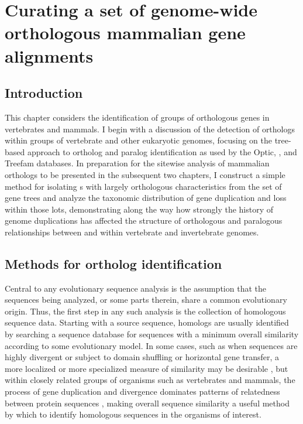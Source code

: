 \chapter{Curating a set of genome-wide orthologous mammalian gene alignments}
\label{ch_orthologs}

\section{Introduction}

This chapter considers the identification of groups of orthologous
genes in vertebrates and mammals. I begin with a discussion of the
detection of orthologs within groups of vertebrate and other
eukaryotic genomes, focusing on the tree-based approach to ortholog
and paralog identification as used by the Optic, \cmp, and Treefam
databases. In preparation for the sitewise analysis of mammalian
orthologs to be presented in the subsequent two chapters, I construct
a simple method for isolating \subtr{}s with largely orthologous
characteristics from the set of \cmp gene trees and analyze the
taxonomic distribution of gene duplication and loss within those
\acp{lot}, demonstrating along the way how strongly the history of
genome duplications has affected the structure of orthologous and
paralogous relationships between and within vertebrate and
invertebrate genomes.

\section{Methods for ortholog identification}

Central to any evolutionary sequence analysis is the assumption that
the sequences being analyzed, or some parts therein, share a common
evolutionary origin. Thus, the first step in any such analysis is the
collection of homologous sequence data. Starting with a source
sequence, homologs are usually identified by searching a sequence
database for sequences with a minimum overall similarity according to
some evolutionary model. In some cases, such as when sequences are
highly divergent or subject to domain shuffling or horizontal gene
transfer, a more localized or more specialized measure of similarity
may be desirable \citep{Koonin2001,Sjolander2011}, but within closely
related groups of organisms such as vertebrates and mammals, the
process of gene duplication and divergence dominates patterns of
relatedness between protein sequences \citep{Ohno1970}, making overall
sequence similarity a useful method by which to identify homologous
sequences in the organisms of interest.

